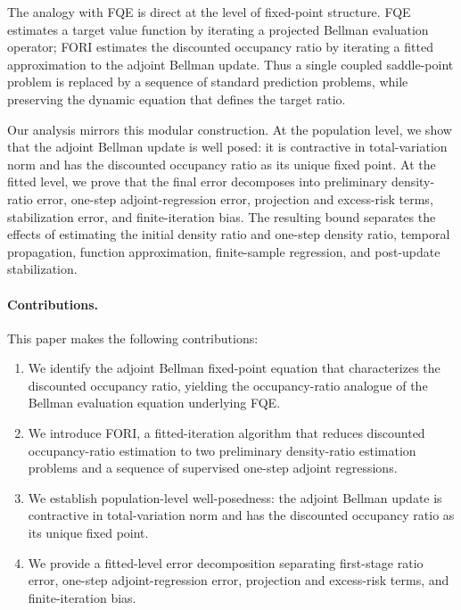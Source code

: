 \documentclass{article}
\newcommand{\1}{\mathbf{1}}
\theoremstyle{plain}
\theoremstyle{definition}
\theoremstyle{remark}
\begin{document}
The analogy with FQE is direct at the level of fixed-point structure. FQE
estimates a target value function by iterating a projected Bellman evaluation
operator; \textsc{FORI} estimates the discounted occupancy ratio by iterating a
fitted approximation to the adjoint Bellman update. Thus a single coupled saddle-point problem
is replaced by a sequence of standard prediction problems, while preserving the
dynamic equation that defines the target ratio.

Our analysis mirrors this modular construction. At the population level, we show
that the adjoint Bellman update is well posed: it is contractive in
total-variation norm and has the discounted occupancy ratio as its unique fixed
point. At the fitted level, we prove that the final error decomposes into
preliminary density-ratio error, one-step adjoint-regression error, projection and excess-risk
terms, stabilization error, and finite-iteration bias. The resulting bound
separates the effects of estimating the initial density ratio and one-step density ratio,
temporal propagation, function approximation, finite-sample regression, and
post-update stabilization.

\paragraph{Contributions.} This paper makes the following contributions:
\begin{enumerate}
    \item We identify the adjoint Bellman fixed-point equation that
    characterizes the discounted occupancy ratio, yielding the occupancy-ratio
    analogue of the Bellman evaluation equation underlying FQE.

    \item We introduce \textsc{FORI}, a fitted-iteration algorithm that reduces
    discounted occupancy-ratio estimation to two preliminary density-ratio
    estimation problems and a sequence of supervised one-step adjoint regressions.

    \item We establish population-level well-posedness: the adjoint Bellman
    update is contractive in total-variation norm and has the discounted
    occupancy ratio as its unique fixed point.

    \item We provide a fitted-level error decomposition separating first-stage
    ratio error, one-step adjoint-regression error, projection and excess-risk terms,
    and finite-iteration bias.
\end{enumerate}
\end{document}
